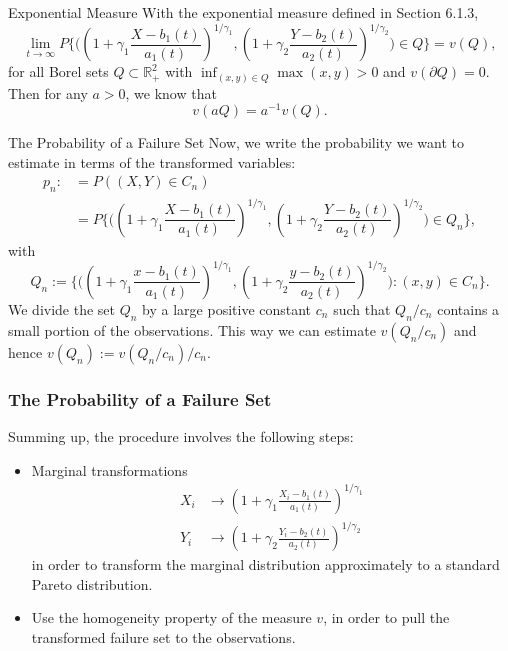 \documentclass[11pt]{beamer}
\newcommand{\suit}[1]{\left(#1\right)}
\begin{document}
\begin{frame}{Exponential Measure}
With the exponential measure defined in Section 6.1.3, 
\begin{displaymath}
\lim_{t\to \infty} P\{  \big(  (1+\gamma_1 \dfrac{X-b_1(t)}{a_1(t)})^{1/\gamma_1}, (1+\gamma_2 \dfrac{Y-b_2(t)}{a_2(t)})^{1/\gamma_2} \big) \in Q\}=v(Q),
\end{displaymath}
for all Borel sets $Q\subset \mathbb{R}_{+}^2$ with $\inf_{(x,y)\in Q} \max(x,y)>0$ and $v(\partial Q)=0$. Then for any $a>0$, we know that
\begin{displaymath}
v(aQ)=a^{-1}v(Q).
\end{displaymath}
\end{frame}

\begin{frame}{The Probability of a Failure Set}
Now, we write the probability we want to estimate in terms of the transformed variables:
\begin{equation}\tag{8.1.6}
\begin{split}
p_n: &=P((X,Y)\in C_n)\\
		&=P\{ \big(    (1+\gamma_1 \dfrac{X-b_1(t)}{a_1(t)})^{1/\gamma_1}, (1+\gamma_2 \dfrac{Y-b_2(t)}{a_2(t)})^{1/\gamma_2}            \big)\in Q_n\},
\end{split}
\end{equation}
with
\begin{displaymath}
Q_n:=\{  \big(    (1+\gamma_1 \dfrac{x-b_1(t)}{a_1(t)})^{1/\gamma_1}, (1+\gamma_2 \dfrac{y-b_2(t)}{a_2(t)})^{1/\gamma_2}            \big):(x,y)\in C_n        \}.
\end{displaymath}
We divide the set $Q_n$ by a large positive constant $c_n$ such that $Q_n/c_n$ contains a small portion of the
observations. This way we can estimate $v(Q_n/c_n)$ and hence $v(Q_n):=v(Q_n/c_n)/c_n$.
\end{frame}

\begin{frame}
  \frametitle{The Probability of a Failure Set}
Summing up, the procedure involves the following steps:
\begin{itemize}
  \item Marginal transformations
  $$
  \begin{aligned}
X_i &\to \suit{1+\gamma_1 \frac{X_i-b_1(t)}{a_1(t)}}^{1/\gamma_1}\\
  Y_i &\to \suit{1+\gamma_2 \frac{Y_i-b_2(t)}{a_2(t)}}^{1/\gamma_2}
  \end{aligned}
  $$
  in order to transform the marginal distribution approximately to a standard Pareto distribution.
  \item Use the homogeneity property of the measure $v$, in order to pull the transformed failure set to the observations.
\end{itemize}
\end{frame}
\end{document}
